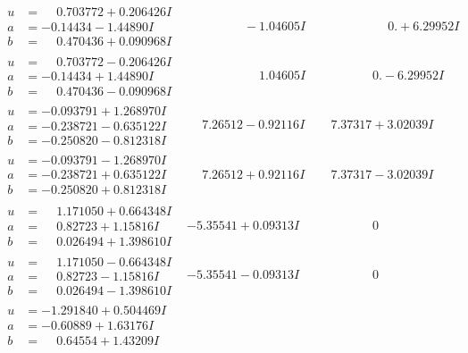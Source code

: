 \documentclass[1p]{elsarticle_modified}
\theoremstyle{definition}
\begin{document}
$$\begin{array}{c|c|c}
\begin{aligned}
u &= \phantom{-}0.703772 + 0.206426 I \\
a &= -0.14434 - 1.44890 I \\
b &= \phantom{-}0.470436 + 0.090968 I\end{aligned}
 & \phantom{-0.000000 } -1.04605 I & \phantom{-0.000000 -}0. + 6.29952 I \\ \hline\begin{aligned}
u &= \phantom{-}0.703772 - 0.206426 I \\
a &= -0.14434 + 1.44890 I \\
b &= \phantom{-}0.470436 - 0.090968 I\end{aligned}
 & \phantom{-0.000000 -}1.04605 I & \phantom{-0.000000 } 0. - 6.29952 I \\ \hline\begin{aligned}
u &= -0.093791 + 1.268970 I \\
a &= -0.238721 - 0.635122 I \\
b &= -0.250820 - 0.812318 I\end{aligned}
 & \phantom{-}7.26512 - 0.92116 I & \phantom{-}7.37317 + 3.02039 I \\ \hline\begin{aligned}
u &= -0.093791 - 1.268970 I \\
a &= -0.238721 + 0.635122 I \\
b &= -0.250820 + 0.812318 I\end{aligned}
 & \phantom{-}7.26512 + 0.92116 I & \phantom{-}7.37317 - 3.02039 I \\ \hline\begin{aligned}
u &= \phantom{-}1.171050 + 0.664348 I \\
a &= \phantom{-}0.82723 + 1.15816 I \\
b &= \phantom{-}0.026494 + 1.398610 I\end{aligned}
 & -5.35541 + 0.09313 I & \phantom{-0.000000 } 0 \\ \hline\begin{aligned}
u &= \phantom{-}1.171050 - 0.664348 I \\
a &= \phantom{-}0.82723 - 1.15816 I \\
b &= \phantom{-}0.026494 - 1.398610 I\end{aligned}
 & -5.35541 - 0.09313 I & \phantom{-0.000000 } 0 \\ \hline\begin{aligned}
u &= -1.291840 + 0.504469 I \\
a &= -0.60889 + 1.63176 I \\
b &= \phantom{-}0.64554 + 1.43209 I\end{aligned}

\end{array}$$
\end{document}
